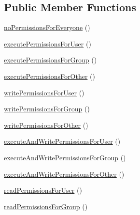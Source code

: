 \subsection*{Public Member Functions}
\begin{DoxyCompactItemize}
\item 
\mbox{\hyperlink{classorg_1_1bovigo_1_1vfs_1_1vfs_stream_abstract_content_test_case_a2016c9159e4db38000f3cf997f03c34e}{no\+Permissions\+For\+Everyone}} ()
\item 
\mbox{\hyperlink{classorg_1_1bovigo_1_1vfs_1_1vfs_stream_abstract_content_test_case_ab0d9bdbc593bb5932f52beb36ba6edad}{execute\+Permissions\+For\+User}} ()
\item 
\mbox{\hyperlink{classorg_1_1bovigo_1_1vfs_1_1vfs_stream_abstract_content_test_case_aa015010ab7c2925cbeca2bb9552ca074}{execute\+Permissions\+For\+Group}} ()
\item 
\mbox{\hyperlink{classorg_1_1bovigo_1_1vfs_1_1vfs_stream_abstract_content_test_case_a359862ff710493907048752989121f99}{execute\+Permissions\+For\+Other}} ()
\item 
\mbox{\hyperlink{classorg_1_1bovigo_1_1vfs_1_1vfs_stream_abstract_content_test_case_a7814ee134ab1929732647be7584beef3}{write\+Permissions\+For\+User}} ()
\item 
\mbox{\hyperlink{classorg_1_1bovigo_1_1vfs_1_1vfs_stream_abstract_content_test_case_a29f571f4170ff2d0eb63dbdf25b0b145}{write\+Permissions\+For\+Group}} ()
\item 
\mbox{\hyperlink{classorg_1_1bovigo_1_1vfs_1_1vfs_stream_abstract_content_test_case_aea2f7673dc8b0d80145425e23134192b}{write\+Permissions\+For\+Other}} ()
\item 
\mbox{\hyperlink{classorg_1_1bovigo_1_1vfs_1_1vfs_stream_abstract_content_test_case_a3e6420eb16eaac8a2b0a12a38fabc5ba}{execute\+And\+Write\+Permissions\+For\+User}} ()
\item 
\mbox{\hyperlink{classorg_1_1bovigo_1_1vfs_1_1vfs_stream_abstract_content_test_case_a9212832cd8e60da82b4d08079bcde560}{execute\+And\+Write\+Permissions\+For\+Group}} ()
\item 
\mbox{\hyperlink{classorg_1_1bovigo_1_1vfs_1_1vfs_stream_abstract_content_test_case_a66a8fcf70a2001f507b27c994e27ad63}{execute\+And\+Write\+Permissions\+For\+Other}} ()
\item 
\mbox{\hyperlink{classorg_1_1bovigo_1_1vfs_1_1vfs_stream_abstract_content_test_case_a6a585ca4a3a191fc218037adc0a54aa2}{read\+Permissions\+For\+User}} ()
\item 
\mbox{\hyperlink{classorg_1_1bovigo_1_1vfs_1_1vfs_stream_abstract_content_test_case_a2c0c308a36f38375735c2a4eb4061f17}{read\+Permissions\+For\+Group}} ()

\end{DoxyCompactItemize}
